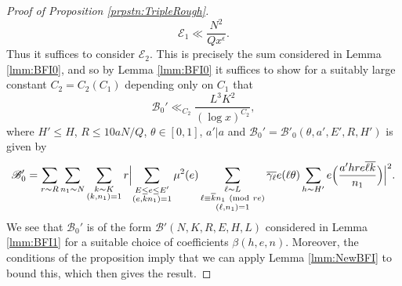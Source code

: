 \documentclass[10pt]{amsart}
\theoremstyle{plain}
\numberwithin{equation}{section}
\newcommand{\Mod}[1]{\ (\mathrm{mod}\ #1)}
\begin{document}
\begin{proof}[Proof of Proposition \ref{prpstn:TripleRough}]
\[
\mathscr{E}_1\ll \frac{N^2}{Q x^\epsilon}.
\]
Thus it suffices to consider $\mathscr{E}_2$. This is precisely the sum considered in Lemma \ref{lmm:BFI0}, and so by Lemma \ref{lmm:BFI0} it suffices to show for a suitably large constant $C_2=C_2(C_1)$ depending only on $C_1$ that
\[
\mathscr{B}_0'\ll_{C_2}\frac{L^3 K^2}{(\log{x})^{C_2}},
\]
where $H'\le H$, $R\le 10aN/Q$, $\theta\in[0,1]$, $a'|a$ and $\mathscr{B}_0'=\mathscr{B}'_0(\theta,a',E',R,H')$ is given by
\[
\mathscr{B}_0'=\sum_{r\sim R}\sum_{n_1\sim N}\sum_{\substack{k\sim K\\ (k,n_1)=1}}r\Bigl|\sum_{\substack{E\le e\le E'\\ (e,kn_1)=1}}\mu^2(e)\sum_{\substack{\ell\sim L\\ \ell \equiv \overline{k}n_1\Mod{r e} \\ (\ell,n_1)=1}}\overline{\gamma_\ell}e(\ell\theta)\sum_{h\sim  H'} e\Bigl(\frac{a'h r e\overline{\ell k}}{n_1}\Bigr)\Bigr|^2.
\]
We see that $\mathscr{B}_0'$ is of the form $\mathscr{B}'(N,K,R,E,H,L)$ considered in Lemma \ref{lmm:BFI1} for a suitable choice of coefficients $\beta(h,e,n)$. Moreover, the conditions of the proposition imply that we can apply Lemma \ref{lmm:NewBFI} to bound this, which then gives the result.
\end{proof}
%
%
%
%
%
%
%
%
%
%
%
%
%
%
%
%
%
%
%
\end{document}
